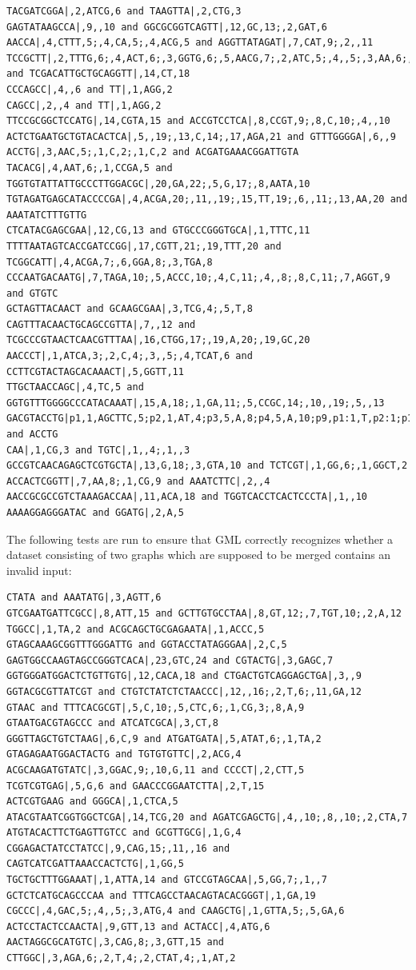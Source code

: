 \documentclass[a4paper,12pt,twoside,BCOR=10mm]{scrbook}
\begin{document}
\begin{lstlisting}
TACGATCGGA|,2,ATCG,6 and TAAGTTA|,2,CTG,3
GAGTATAAGCCA|,9,,10 and GGCGCGGTCAGTT|,12,GC,13;,2,GAT,6
AACCA|,4,CTTT,5;,4,CA,5;,4,ACG,5 and AGGTTATAGAT|,7,CAT,9;,2,,11
TCCGCTT|,2,TTTG,6;,4,ACT,6;,3,GGTG,6;,5,AACG,7;,2,ATC,5;,4,,5;,3,AA,6;,3,GGA,7 and TCGACATTGCTGCAGGTT|,14,CT,18
CCCAGCC|,4,,6 and TT|,1,AGG,2
CAGCC|,2,,4 and TT|,1,AGG,2
TTCCGCGGCTCCATG|,14,CGTA,15 and ACCGTCCTCA|,8,CCGT,9;,8,C,10;,4,,10
ACTCTGAATGCTGTACACTCA|,5,,19;,13,C,14;,17,AGA,21 and GTTTGGGGA|,6,,9
ACCTG|,3,AAC,5;,1,C,2;,1,C,2 and ACGATGAAACGGATTGTA
TACACG|,4,AAT,6;,1,CCGA,5 and TGGTGTATTATTGCCCTTGGACGC|,20,GA,22;,5,G,17;,8,AATA,10
TGTAGATGAGCATACCCCGA|,4,ACGA,20;,11,,19;,15,TT,19;,6,,11;,13,AA,20 and AAATATCTTTGTTG
CTCATACGAGCGAA|,12,CG,13 and GTGCCCGGGTGCA|,1,TTTC,11
TTTTAATAGTCACCGATCCGG|,17,CGTT,21;,19,TTT,20 and TCGGCATT|,4,ACGA,7;,6,GGA,8;,3,TGA,8
CCCAATGACAATG|,7,TAGA,10;,5,ACCC,10;,4,C,11;,4,,8;,8,C,11;,7,AGGT,9 and GTGTC
GCTAGTTACAACT and GCAAGCGAA|,3,TCG,4;,5,T,8
CAGTTTACAACTGCAGCCGTTA|,7,,12 and TCGCCCGTAACTCAACGTTTAA|,16,CTGG,17;,19,A,20;,19,GC,20
AACCCT|,1,ATCA,3;,2,C,4;,3,,5;,4,TCAT,6 and CCTTCGTACTAGCACAAACT|,5,GGTT,11
TTGCTAACCAGC|,4,TC,5 and GGTGTTTGGGGCCCATACAAAT|,15,A,18;,1,GA,11;,5,CCGC,14;,10,,19;,5,,13
GACGTACCTG|p1,1,AGCTTC,5;p2,1,AT,4;p3,5,A,8;p4,5,A,10;p9,p1:1,T,p2:1;p10,p2:1,ACT,p4:0;,p9:0,G,p10:1;,p2:1,,p4:0 and ACCTG
CAA|,1,CG,3 and TGTC|,1,,4;,1,,3
GCCGTCAACAGAGCTCGTGCTA|,13,G,18;,3,GTA,10 and TCTCGT|,1,GG,6;,1,GGCT,2
ACCACTCGGTT|,7,AA,8;,1,CG,9 and AAATCTTC|,2,,4
AACCGCGCCGTCTAAAGACCAA|,11,ACA,18 and TGGTCACCTCACTCCCTA|,1,,10
AAAAGGAGGGATAC and GGATG|,2,A,5
\end{lstlisting}

The following tests are run to ensure that GML correctly recognizes whether a dataset 
consisting of two graphs which are supposed to be merged contains an invalid input:

\begin{lstlisting}
CTATA and AAATATG|,3,AGTT,6
GTCGAATGATTCGCC|,8,ATT,15 and GCTTGTGCCTAA|,8,GT,12;,7,TGT,10;,2,A,12
TGGCC|,1,TA,2 and ACGCAGCTGCGAGAATA|,1,ACCC,5
GTAGCAAAGCGGTTTGGGATTG and GGTACCTATAGGGAA|,2,C,5
GAGTGGCCAAGTAGCCGGGTCACA|,23,GTC,24 and CGTACTG|,3,GAGC,7
GGTGGGATGGACTCTGTTGTG|,12,CACA,18 and CTGACTGTCAGGAGCTGA|,3,,9
GGTACGCGTTATCGT and CTGTCTATCTCTAACCC|,12,,16;,2,T,6;,11,GA,12
GTAAC and TTTCACGCGT|,5,C,10;,5,CTC,6;,1,CG,3;,8,A,9
GTAATGACGTAGCCC and ATCATCGCA|,3,CT,8
GGGTTAGCTGTCTAAG|,6,C,9 and ATGATGATA|,5,ATAT,6;,1,TA,2
GTAGAGAATGGACTACTG and TGTGTGTTC|,2,ACG,4
ACGCAAGATGTATC|,3,GGAC,9;,10,G,11 and CCCCT|,2,CTT,5
TCGTCGTGAG|,5,G,6 and GAACCCGGAATCTTA|,2,T,15
ACTCGTGAAG and GGGCA|,1,CTCA,5
ATACGTAATCGGTGGCTCGA|,14,TCG,20 and AGATCGAGCTG|,4,,10;,8,,10;,2,CTA,7
ATGTACACTTCTGAGTTGTCC and GCGTTGCG|,1,G,4
CGGAGACTATCCTATCC|,9,CAG,15;,11,,16 and CAGTCATCGATTAAACCACTCTG|,1,GG,5
TGCTGCTTTGGAAAT|,1,ATTA,14 and GTCCGTAGCAA|,5,GG,7;,1,,7
GCTCTCATGCAGCCCAA and TTTCAGCCTAACAGTACACGGGT|,1,GA,19
CGCCC|,4,GAC,5;,4,,5;,3,ATG,4 and CAAGCTG|,1,GTTA,5;,5,GA,6
ACTCCTACTCCAACTA|,9,GTT,13 and ACTACC|,4,ATG,6
AACTAGGCGCATGTC|,3,CAG,8;,3,GTT,15 and CTTGGC|,3,AGA,6;,2,T,4;,2,CTAT,4;,1,AT,2
\end{lstlisting}
\end{document}
